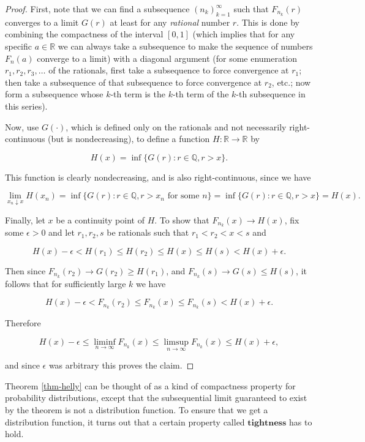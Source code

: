 \documentclass[11pt]{report}
\newcommand{\R}{\mathbb{R}}
\theoremstyle{plain}
\theoremstyle{definition}
\begin{document}
\begin{proof}
First, note that we can find a subsequence
$(n_k)_{k=1}^\infty$ such that $F_{n_k}(r)$ converges
to a limit $G(r)$ at least for any \emph{rational} number
$r$. This is done by combining the compactness of the
interval $[0,1]$ (which implies that for any specific
$a\in\R$ we can always take a subsequence to make the
sequence of numbers $F_n(a)$ converge to a limit)
with a diagonal argument (for some enumeration
$r_1, r_2, r_3, \ldots$ of the rationals, first take
a subsequence to force convergence at $r_1$; then
take a subsequence of that subsequence to force
convergence at $r_2$, etc.; now form a subsequence
whose $k$-th term is the $k$-th term of the $k$-th
subsequence in this series).

Now, use $G(\cdot)$, which is defined only on the
rationals and not necessarily right-continuous (but is
nondecreasing), to define a function $H:\R \to \R$ by

\[
H(x) = \inf\{ G(r) : r\in\mathbb{Q}, r>x \}.
\]

This function is clearly nondecreasing, and is also
right-continuous, since we have

\[
\lim_{x_n \downarrow x} H(x_n) = \inf\{ G(r) : r\in\mathbb{Q}, r>x_n\textrm{ for some }n \}
= \inf\{ G(r) : r\in\mathbb{Q}, r>x \} = H(x).
\]

Finally, let $x$ be a continuity point of $H$. To
show that $F_{n_k}(x)\to H(x)$, fix some $\epsilon>0$
and let $r_1,r_2,s$ be rationals such that
$r_1 < r_2 < x < s$ and

\[
H(x)-\epsilon < H(r_1) \le H(r_2) \le H(x) \le H(s) < H(x)+\epsilon.
\]

Then since $F_{n_k}(r_2)\to G(r_2)\ge H(r_1)$, and
$F_{n_k}(s)\to G(s)\le H(s)$, it follows that for
sufficiently large $k$ we have

\[
H(x)-\epsilon < F_{n_k}(r_2) \le F_{n_k}(x) \le F_{n_k}(s) < H(x)+\epsilon.
\]

Therefore

\[
H(x)-\epsilon \le \liminf_{n\to\infty} F_{n_k}(x) \le \limsup_{n\to\infty} F_{n_k}(x) \le H(x)+\epsilon,
\]

and since $\epsilon$ was arbitrary this proves the
claim.
\end{proof}

Theorem \ref{thm-helly} can be thought of as a kind of
compactness property for probability distributions,
except that the subsequential limit guaranteed to
exist by the theorem is not a distribution function.
To ensure that we get a distribution function, it
turns out that a certain property called
$\textbf{tightness}$ has to hold.
\end{document}
